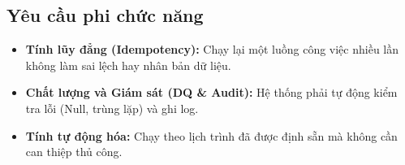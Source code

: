 \subsection{Yêu cầu phi chức năng}
\begin{itemize}
    \item \textbf{Tính lũy đẳng (Idempotency):} Chạy lại một luồng công việc nhiều lần không làm sai lệch hay nhân bản dữ liệu.
    \item \textbf{Chất lượng và Giám sát (DQ \& Audit):} Hệ thống phải tự động kiểm tra lỗi (Null, trùng lặp) và ghi log.
    \item \textbf{Tính tự động hóa:} Chạy theo lịch trình đã được định sẵn mà không cần can thiệp thủ công.
\end{itemize}
